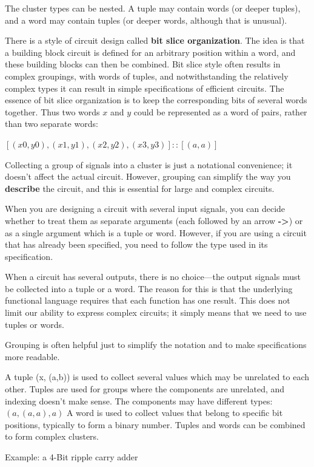 \documentclass[]{svmono}
\begin{document}
The cluster types can be nested.  A tuple may contain words (or deeper
tuples), and a word may contain tuples (or deeper words, although that
is unusual).

There is a style of circuit design called \textbf{bit slice
  organization}.  The idea is that a building block circuit is defined
for an arbitrary position within a word, and these building blocks can
then be combined.  Bit slice style often results in complex groupings,
with words of tuples, and notwithstanding the relatively complex types
it can result in simple specifications of efficient circuits.  The
essence of bit slice organization is to keep the corresponding bits of
several words together.  Thus two words \(x\) and \(y\) could be
represented as a word of pairs, rather than two separate words:

\([(x0,y0), (x1,y1), (x2,y2), (x3,y3)] :: [(a,a)]\)

Collecting a group of signals into a cluster is just a notational
convenience; it doesn't affect the actual circuit.  However, grouping
can simplify the way you \textbf{describe} the circuit, and this is essential
for large and complex circuits.

When you are designing a circuit with several input signals, you can
decide whether to treat them as separate arguments (each followed by
an arrow \textbf{->}) or as a single argument which is a tuple or word.
However, if you are using a circuit that has already been specified,
you need to follow the type used in its specification.

When a circuit has several outputs, there is no choice---the output
signals must be collected into a tuple or a word.  The reason for this
is that the underlying functional language requires that each function
has one result.  This does not limit our ability to express complex
circuits; it simply means that we need to use tuples or words.

Grouping is often helpful just to simplify the notation and to make
specifications more readable.

A tuple (x, (a,b)) is used to collect several values which may be
unrelated to each other.  Tuples are used for groups where the
components are unrelated, and indexing doesn't make sense.  The
components may have different types: \((a, (a,a), a)\) A word is used to
collect values that belong to specific bit positions, typically to
form a binary number.  Tuples and words can be combined to form
complex clusters.

Example: a 4-Bit ripple carry adder
\end{document}
